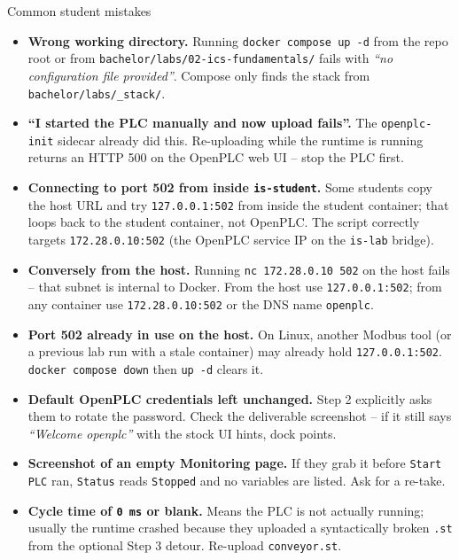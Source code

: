 \documentclass[11pt,a4paper]{article}
\begin{document}
\begin{solutionbox}{Common student mistakes}
\begin{itemize}[leftmargin=*, nosep]
  \item \textbf{Wrong working directory.} Running \texttt{docker compose up -d} from the repo root or from \texttt{bachelor/labs/02-ics-fundamentals/} fails with \emph{``no configuration file provided''}. Compose only finds the stack from \texttt{bachelor/labs/\_stack/}.
  \item \textbf{``I started the PLC manually and now upload fails''.} The \texttt{openplc-init} sidecar already did this. Re-uploading while the runtime is running returns an HTTP 500 on the OpenPLC web UI -- stop the PLC first.
  \item \textbf{Connecting to port 502 from inside \texttt{is-student}.} Some students copy the host URL and try \texttt{127.0.0.1:502} from inside the student container; that loops back to the student container, not OpenPLC. The script correctly targets \texttt{172.28.0.10:502} (the OpenPLC service IP on the \texttt{is-lab} bridge).
  \item \textbf{Conversely from the host.} Running \texttt{nc 172.28.0.10 502} on the host fails -- that subnet is internal to Docker. From the host use \texttt{127.0.0.1:502}; from any container use \texttt{172.28.0.10:502} or the DNS name \texttt{openplc}.
  \item \textbf{Port 502 already in use on the host.} On Linux, another Modbus tool (or a previous lab run with a stale container) may already hold \texttt{127.0.0.1:502}. \texttt{docker compose down} then \texttt{up -d} clears it.
  \item \textbf{Default OpenPLC credentials left unchanged.} Step 2 explicitly asks them to rotate the password. Check the deliverable screenshot -- if it still says \emph{``Welcome openplc''} with the stock UI hints, dock points.
  \item \textbf{Screenshot of an empty Monitoring page.} If they grab it before \texttt{Start PLC} ran, \texttt{Status} reads \texttt{Stopped} and no variables are listed. Ask for a re-take.
  \item \textbf{Cycle time of \texttt{0\,ms} or blank.} Means the PLC is not actually running; usually the runtime crashed because they uploaded a syntactically broken \texttt{.st} from the optional Step 3 detour. Re-upload \texttt{conveyor.st}.
\end{itemize}
\end{solutionbox}
\end{document}
